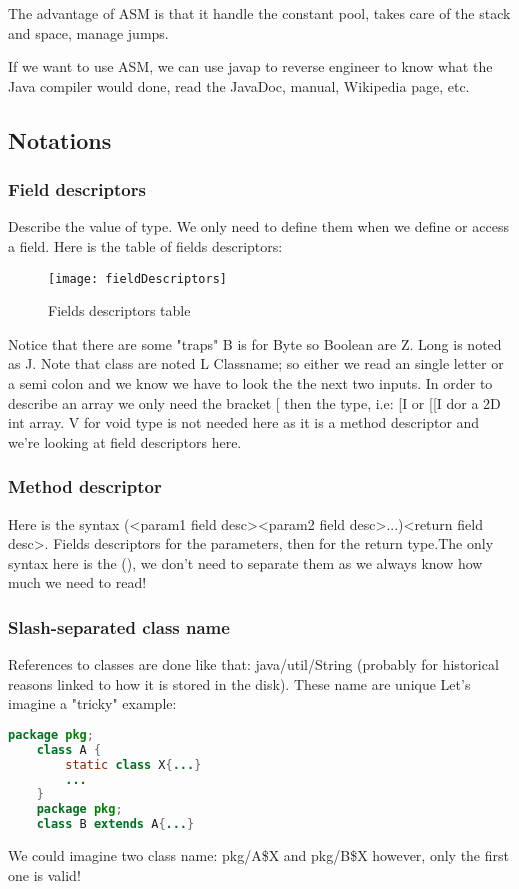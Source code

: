 The advantage of ASM is that it handle the constant pool, takes care of the
stack and space, manage jumps.  

If we want to use ASM, we can use javap to reverse engineer to know what the
Java compiler would done, read the JavaDoc, manual, Wikipedia page, etc.

\subsection{Notations}
\subsubsection{Field descriptors}
Describe the value of type. We only need to define them when we define or access
a field.
Here is the table of fields descriptors:
\begin{figure}[H]
     \centering
     \texttt{[image: fieldDescriptors]}
     \caption{Fields descriptors table}
     \label{fig:field_descriptors}
\end{figure}
Notice that there are some "traps" B is for Byte so Boolean are Z. Long is noted
as J. Note that class are noted L Classname; so either we read an single letter
or a semi colon and we know we have to look the the next two inputs. In order to
describe an array we only need the bracket [ then the type, i.e: [I or [[I dor a
2D int array. V for void type is not needed here as it is a method descriptor
and we're looking at field descriptors here.
\subsubsection{Method descriptor}
Here is the syntax (<param1 field desc><param2 field desc>...)<return field
desc>. Fields descriptors for the parameters, then for the return type.The only
syntax here is the (), we don't need to separate them as we always know how much
we need to read!

\subsubsection{Slash-separated class name}
References to classes are done like that: java/util/String (probably for
historical reasons linked to how it is stored in the disk). These name are unique
Let's imagine a "tricky" example:
\begin{lstlisting}[language=Java]
    package pkg;
    class A {
        static class X{...}
        ...
    }
    package pkg;
    class B extends A{...}
\end{lstlisting}
We could imagine two class name: pkg/A\$X and pkg/B\$X however, only the first
one is valid!